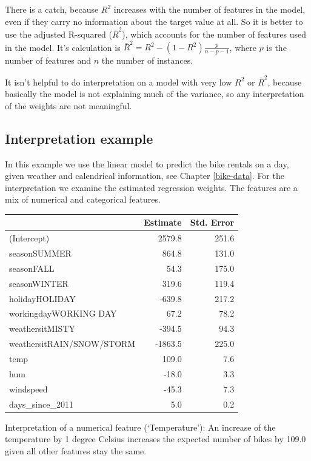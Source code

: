 \documentclass[12pt,]{krantz}
\theoremstyle{definition}
\theoremstyle{definition}
\theoremstyle{definition}
\theoremstyle{remark}
\begin{document}
There is a catch, because \(R^2\) increases with the number of features
in the model, even if they carry no information about the target value
at all. So it is better to use the adjusted R-squared (\(\bar{R}^2\)),
which accounts for the number of features used in the model. It's
calculation is \(\bar{R}^2 = R^2 - (1-R^2)\frac{p}{n - p - 1}\), where
\(p\) is the number of features and \(n\) the number of instances.

It isn't helpful to do interpretation on a model with very low \(R^2\)
or \(\bar{R}^2\), because basically the model is not explaining much of
the variance, so any interpretation of the weights are not meaningful.

\subsection{Interpretation example}\label{interpretation-example}

In this example we use the linear model to predict the bike rentals on a
day, given weather and calendrical information, see Chapter
\ref{bike-data}. For the interpretation we examine the estimated
regression weights. The features are a mix of numerical and categorical
features.

\begin{tabular}{l|r|r}
\hline
  & Estimate & Std. Error\\
\hline
(Intercept) & 2579.8 & 251.6\\
\hline
seasonSUMMER & 864.8 & 131.0\\
\hline
seasonFALL & 54.3 & 175.0\\
\hline
seasonWINTER & 319.6 & 119.4\\
\hline
holidayHOLIDAY & -639.8 & 217.2\\
\hline
workingdayWORKING DAY & 67.2 & 78.2\\
\hline
weathersitMISTY & -394.5 & 94.3\\
\hline
weathersitRAIN/SNOW/STORM & -1863.5 & 225.0\\
\hline
temp & 109.0 & 7.6\\
\hline
hum & -18.0 & 3.3\\
\hline
windspeed & -45.3 & 7.3\\
\hline
days\_since\_2011 & 5.0 & 0.2\\
\hline
\end{tabular}

Interpretation of a numerical feature (`Temperature'): An increase of
the temperature by 1 degree Celsius increases the expected number of
bikes by 109.0 given all other features stay the same.
\end{document}
